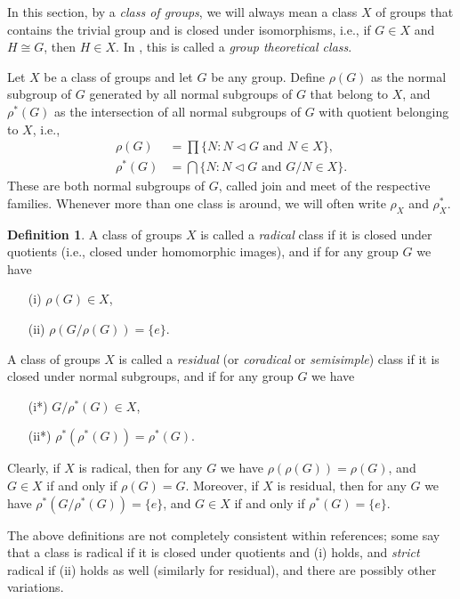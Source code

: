 \documentclass[a4paper]{amsart}
\theoremstyle{plain}
\theoremstyle{definition}
\newtheorem{definition}[theorem]{Definition}
\theoremstyle{remark}
\numberwithin{theorem}{section}
\begin{document}
In this section, by a \emph{class of groups}, we will always mean a class $X$ of groups that contains the trivial group
and is closed under isomorphisms, i.e., if $G\in X$ and $H\cong G$, then $H\in X$.
In \cite{Robinson}, this is called a \emph{group theoretical class}.

Let $X$ be a class of groups and let $G$ be any group.
Define $\rho(G)$ as the normal subgroup of $G$ generated by all normal subgroups of $G$ that belong to $X$,
and $\rho^*(G)$ as the intersection of all normal subgroups of $G$ with quotient belonging to $X$, i.e.,
\[
\begin{split}
\rho(G)&=\prod\{N : N\triangleleft G \text{ and } N\in X\},\\
\rho^*(G)&=\bigcap\{N : N\triangleleft G \text{ and } G/N\in X\}.
\end{split}
\]
These are both normal subgroups of $G$, called join and meet of the respective families.
Whenever more than one class is around, we will often write $\rho_X$ and $\rho_X^*$.

\begin{definition}\label{def:radical-residual}
A class of groups $X$ is called a \emph{radical} class if it is closed under quotients (i.e., closed under homomorphic images),
and if for any group $G$ we have
\begin{itemize}
\item[(i)] $\rho(G)\in X$,
\item[(ii)] $\rho(G/\rho(G))=\{e\}$.
\end{itemize}
A class of groups $X$ is called a \emph{residual} (or \emph{coradical} or \emph{semisimple}) class if it is closed under normal subgroups,
and if for any group $G$ we have
\begin{itemize}
\item[(i*)] $G/\rho^*(G)\in X$,
\item[(ii*)] $\rho^*(\rho^*(G))=\rho^*(G)$.
\end{itemize}
\end{definition}

Clearly, if $X$ is radical, then for any $G$ we have $\rho(\rho(G))=\rho(G)$, and $G\in X$ if and only if $\rho(G)=G$.
Moreover, if $X$ is residual, then for any $G$ we have $\rho^*(G/\rho^*(G))=\{e\}$, and $G\in X$ if and only if $\rho^*(G)=\{e\}$.

The above definitions are not completely consistent within references;
some say that a class is radical if it is closed under quotients and (i) holds,
and \emph{strict} radical if (ii) holds as well (similarly for residual),
and there are possibly other variations.
\end{document}
